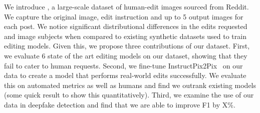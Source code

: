 We introduce \RealEdit, a large-scale dataset of human-edit images sourced from Reddit. We capture the original image, edit instruction and up to 5 output images for each post. We notice significant distributional differences in the edits requested and image subjects when compared to existing synthetic datasets used to train editing models. Given this, we propose three contributions of our dataset. First, we evaluate 6 state of the art editing models on our dataset, showing that they fail to cater to human requests. Second, we fine-tune InstructPix2Pix~\cite{brooks2023instructpix2pix} on our data to create a model that performs real-world edits successfully. We evaluate this on automated metrics as well as humans and find we outrank existing models (some quick result to show this quantitatively). Third, we examine the use of our data in deepfake detection and find that we are able to improve F1 by X\%.


